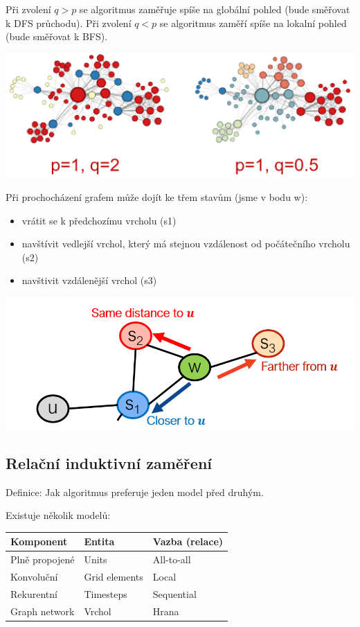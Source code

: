 Při zvolení $q>p$ se algoritmus zaměřuje spíše na globální pohled (bude směřovat k DFS průchodu). Při zvolení $q<p$ se algoritmus zaměří spíše na lokalní pohled (bude směřovat k BFS).

\begin{center}
	\includegraphics[width=\textwidth]{images/node2vecQandP.png}
\end{center}

Při prochocházení grafem může dojít ke třem stavům (jsme v bodu w):
\begin{itemize}
	\item vrátit se k předchozímu vrcholu (s1)
	\item navštívit vedlejší vrchol, který má stejnou vzdálenost od počátečního vrcholu (s2)
	\item navštivit vzdálenější vrchol (s3)
\end{itemize}

\begin{center}
	\includegraphics[width=\textwidth]{images/node2vec.png}
\end{center}

\subsection{Relační induktivní zaměření}

Definice: Jak algoritmus preferuje jeden model před druhým. 

Existuje několik modelů:
\begin{table}[!h]
\centering
\begin{tabular}{| >{\arraybackslash}m{4cm}| >{\centering\arraybackslash}m{4cm} | >{\centering\arraybackslash}m{2cm} |}
\hline
Komponent & Entita & Vazba (relace) \\ \hline
Plně propojené & Units & All-to-all \\ \hline
Konvoluční & Grid elements & Local \\ \hline
Rekurentní & Timesteps & Sequential \\ \hline
Graph network & Vrchol & Hrana \\ \hline
\end{tabular}
\end{table}


